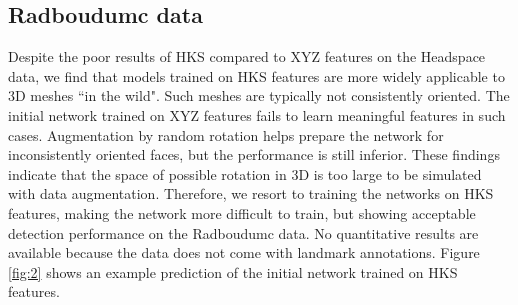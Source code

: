 \documentclass[class=article, crop=false]{standalone}
\begin{document}






\subsection{Radboudumc data}
Despite the poor results of HKS compared to XYZ features on the Headspace data, we find that models trained on HKS features are more widely applicable to 3D meshes ``in the wild". Such meshes are typically not consistently oriented. The initial network trained on XYZ features fails to learn meaningful features in such cases. Augmentation by random rotation helps prepare the network for inconsistently oriented faces, but the performance is still inferior. These findings indicate that the space of possible rotation in 3D is too large to be simulated with data augmentation. Therefore, we resort to training the networks on HKS features, making the network more difficult to train, but showing acceptable detection performance on the Radboudumc data. No quantitative results are available because the data does not come with landmark annotations. Figure \ref{fig:2} shows an example prediction of the initial network trained on HKS features.  
\end{document}
